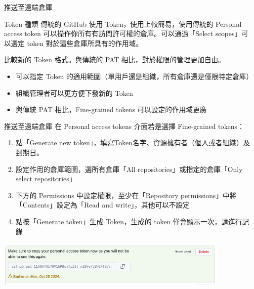\documentclass[xetex, unicode, 10pt, aspectratio=169]{beamer}
\begin{document}
\begin{frame}{推送至遠端倉庫}
    \begin{block}{Token 種類}
        \quad 傳統的 GitHub 使用
        Token，使用上較簡易，使用傳統的 Personal access token
        可以操作你所有有訪問許可權的倉庫。可以通過「Select scopes」可以選定 token 對於這些倉庫所具有的作用域。

        \quad 比較新的 Token 格式。與傳統的 PAT 相比，對於權限的管理更加自由。
        \begin{itemize}
            \item 可以指定 Token 的適用範圍（單用戶還是組織，所有倉庫還是僅限特定倉庫）
            \item 組織管理者可以更方便下發新的 Token
            \item 與傳統 PAT 相比，Fine-grained tokens 可以設定的作用域更廣
        \end{itemize}
    \end{block}
\end{frame}

\begin{frame}{推送至遠端倉庫}
    在 Personal access tokens 介面若是選擇 Fine-grained tokens：
    \begin{enumerate}
        \item 點「Generate new token」，填寫Token名字、資源擁有者（個人或者組織）及到期日。
        \item 設定作用的倉庫範圍，選所有倉庫「All repositories」或指定的倉庫「Only select repositories」
        \item 下方的 Permissions 中設定權限，至少在「Repository
            permissions」中將「Contents」設定為「Read and write」，其他可以不設定
        \item 點按「Generate token」生成 Token，生成的 token 僅會顯示一次，請進行記錄
    \end{enumerate}
    \begin{center}
        \includegraphics[width=4.5in]{./img/github-fine-grained-token.png}
    \end{center}
\end{frame}
\end{document}
